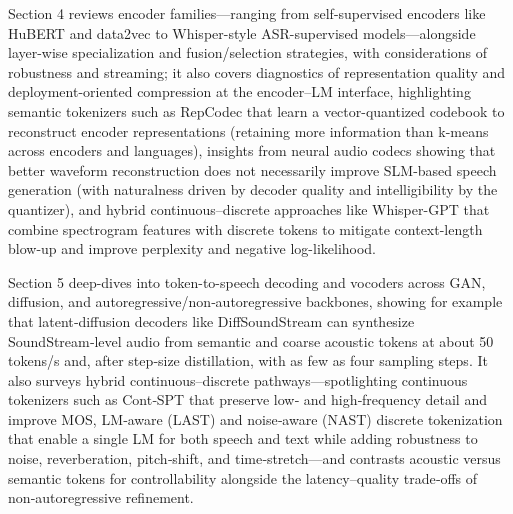 Section 4 reviews encoder families—ranging from self-supervised encoders like HuBERT and data2vec to Whisper-style ASR-supervised models—alongside layer-wise specialization and fusion/selection strategies, with considerations of robustness and streaming; it also covers diagnostics of representation quality and deployment-oriented compression at the encoder–LM interface, highlighting semantic tokenizers such as RepCodec that learn a vector-quantized codebook to reconstruct encoder representations (retaining more information than k-means across encoders and languages), insights from neural audio codecs showing that better waveform reconstruction does not necessarily improve SLM-based speech generation (with naturalness driven by decoder quality and intelligibility by the quantizer), and hybrid continuous–discrete approaches like Whisper-GPT that combine spectrogram features with discrete tokens to mitigate context-length blow-up and improve perplexity and negative log-likelihood. \cite{verma2024whispergpthybridrepresentationaudiolarge,li2024investigatingneuralaudiocodecsspeechlang,huang2024repcodecspeechrepresentationcodectokeniz} 



Section 5 deep-dives into token-to-speech decoding and vocoders across GAN, diffusion, and autoregressive/non‑autoregressive backbones, showing for example that latent‑diffusion decoders like DiffSoundStream can synthesize SoundStream‑level audio from semantic and coarse acoustic tokens at about 50 tokens/s and, after step‑size distillation, with as few as four sampling steps. It also surveys hybrid continuous–discrete pathways—spotlighting continuous tokenizers such as Cont‑SPT that preserve low‑ and high‑frequency detail and improve MOS, LM‑aware (LAST) and noise‑aware (NAST) discrete tokenization that enable a single LM for both speech and text while adding robustness to noise, reverberation, pitch‑shift, and time‑stretch—and contrasts acoustic versus semantic tokens for controllability alongside the latency–quality trade‑offs of non‑autoregressive refinement. \cite{li2025continuousspeechtokenizertext,turetzky2024lastlanguagemodelawarespeechtokenization,yang2025diffsoundstreamefficientspeechtokenizati,messica2024nastnoiseawarespeechtokenizationlanguage,guo2025recentadvancesdiscretespeechtokensreview} 



